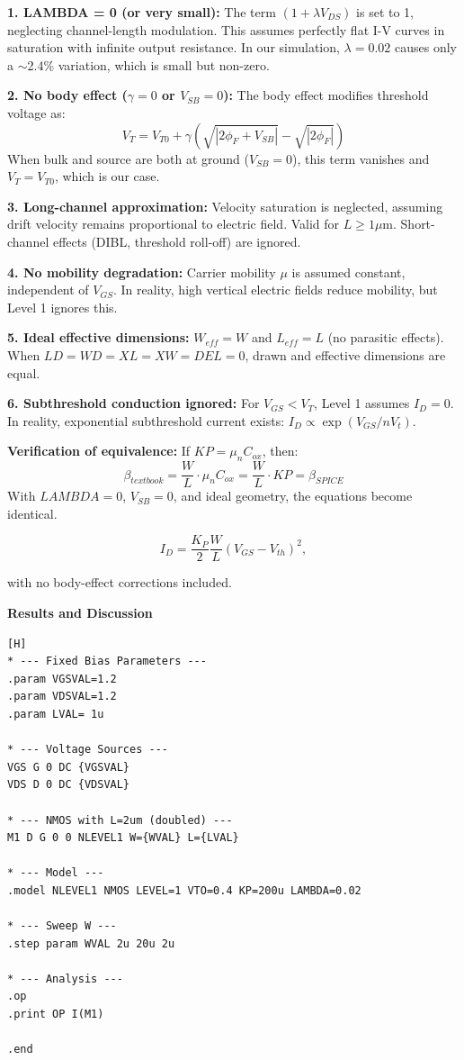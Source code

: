 \documentclass[a4paper,12pt]{article}
\begin{document}
\textbf{1. LAMBDA = 0 (or very small):}
The term $(1 + \lambda V_{DS})$ is set to 1, neglecting channel-length modulation. This assumes perfectly flat I-V curves in saturation with infinite output resistance. In our simulation, $\lambda = 0.02$ causes only a $\sim$2.4\% variation, which is small but non-zero.

\textbf{2. No body effect ($\gamma = 0$ or $V_{SB} = 0$):}
The body effect modifies threshold voltage as:
\begin{equation}
V_T = V_{T0} + \gamma(\sqrt{|2\phi_F + V_{SB}|} - \sqrt{|2\phi_F|})
\end{equation}
When bulk and source are both at ground ($V_{SB} = 0$), this term vanishes and $V_T = V_{T0}$, which is our case.

\textbf{3. Long-channel approximation:}
Velocity saturation is neglected, assuming drift velocity remains proportional to electric field. Valid for $L \geq 1\mu$m. Short-channel effects (DIBL, threshold roll-off) are ignored.

\textbf{4. No mobility degradation:}
Carrier mobility $\mu$ is assumed constant, independent of $V_{GS}$. In reality, high vertical electric fields reduce mobility, but Level 1 ignores this.

\textbf{5. Ideal effective dimensions:}
$W_{eff} = W$ and $L_{eff} = L$ (no parasitic effects). When $LD = WD = XL = XW = DEL = 0$, drawn and effective dimensions are equal.

\textbf{6. Subthreshold conduction ignored:}
For $V_{GS} < V_T$, Level 1 assumes $I_D = 0$. In reality, exponential subthreshold current exists: $I_D \propto \exp(V_{GS}/nV_t)$.

\textbf{Verification of equivalence:}
If $KP = \mu_n C_{ox}$, then:
\begin{equation}
\beta_{textbook} = \frac{W}{L} \cdot \mu_n C_{ox} = \frac{W}{L} \cdot KP = \beta_{SPICE}
\end{equation}
With $LAMBDA = 0$, $V_{SB} = 0$, and ideal geometry, the equations become identical.

\begin{equation}
I_D = \frac{K_P}{2} \frac{W}{L}(V_{GS} - V_{th})^2,
\end{equation}

with no body-effect corrections included.

\textbf{Results and Discussion}

\begin{lstlisting}[caption=Beta Sweep Simulation Code, label=lst:beta_sweep][H]
* --- Fixed Bias Parameters ---
.param VGSVAL=1.2
.param VDSVAL=1.2
.param LVAL= 1u

* --- Voltage Sources ---
VGS G 0 DC {VGSVAL}
VDS D 0 DC {VDSVAL}

* --- NMOS with L=2um (doubled) ---
M1 D G 0 0 NLEVEL1 W={WVAL} L={LVAL}

* --- Model ---
.model NLEVEL1 NMOS LEVEL=1 VTO=0.4 KP=200u LAMBDA=0.02

* --- Sweep W ---
.step param WVAL 2u 20u 2u

* --- Analysis ---
.op
.print OP I(M1)

.end
\end{lstlisting}
\end{document}
